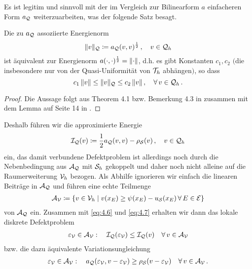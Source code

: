 Es ist legitim und sinnvoll mit der im Vergleich zur Bilinearform $a$ einfacheren Form $a_{\mathcal Q}$ weiterzuarbeiten, was  der folgende Satz besagt.


\begin{satz}\label{satz:4.8}
Die zu $a_{\mathcal Q}$ assoziierte Energienorm
\begin{align*}
	\lVert v\rVert_{\mathcal Q}\coloneqq a_{\mathcal Q}(v,v)^{\frac 1 2} \, , \quad v \in \mathcal Q_h
\end{align*}
ist äquivalent zur Energienorm $a(\cdot,\cdot)^{\frac 12} = \lVert \cdot\rVert$, d.h. es gibt Konstanten $c_1,c_2$ $($die insbesondere nur von der Quasi-Uniformität von $\mathcal T_h$ abhängen$)$, so dass
\[
	c_1 \, \lVert v\rVert \le \lVert v\rVert_{\mathcal Q} \le c_2 \, \lVert v\rVert \, , \quad \forall \, v \in \mathcal Q_h \, .
\]
\end{satz}

\begin{proof}
Die Aussage folgt aus Theorem 4.1 bzw. Bemerkung 4.3 in \cite{HoppeKorn} zusammen mit dem Lemma auf Seite 14 in \cite{Deufl}.
\end{proof}


Deshalb führen wir die approximierte Energie
\begin{align}\label{eq:4.6}
	\mathcal I_{\mathcal Q} (v) \coloneqq \frac 1 2 a_{\mathcal Q}(v,v)-\rho_{\mathcal S}(v) \, , \quad v \in \mathcal Q_h 
\end{align}
ein, das damit verbundene Defektproblem ist allerdings noch durch die Nebenbedingung aus $\mathcal A_{\mathcal Q}$ mit $\mathcal S_h$ gekoppelt und daher noch nicht alleine auf die Raumerweiterung $\mathcal V_h$ bezogen. Als Abhilfe ignorieren wir einfach die linearen Beiträge in $\mathcal A_{\mathcal Q}$ und führen eine echte Teilmenge 
\begin{align}\label{eq:4.7}
	\mathcal A_{\mathcal V} \coloneqq \{v \in \mathcal V_h \mid v(x_E) \ge \psi(x_E)-u_{\mathcal S}(x_E) \, \forall \, E \in \mathcal E\}
\end{align}
von $\mathcal A_{\mathcal Q}$ ein. Zusammen mit \eqref{eq:4.6} und \eqref{eq:4.7} erhalten wir dann das lokale diskrete Defektproblem
\begin{align}\label{eq:4.8}
	\varepsilon_{\mathcal V} \in \mathcal A_{\mathcal V} : \quad \mathcal I_{\mathcal Q}(\varepsilon_{\mathcal V}) \le \mathcal I_{\mathcal Q} (v) \quad \forall \, v \in \mathcal A_{\mathcal V}
\end{align}
bzw. die dazu äquivalente Variationsungleichung
\begin{align}\label{eq:4.9}
	\varepsilon_{\mathcal V} \in \mathcal A_{\mathcal V} : \quad a_{\mathcal Q} (\varepsilon_{\mathcal V},v-\varepsilon_{\mathcal V})\ge \rho_{\mathcal S} (v-\varepsilon_{\mathcal V}) \quad \forall \, v \in \mathcal A_{\mathcal V} \, .
\end{align}


